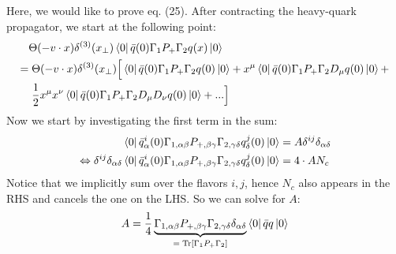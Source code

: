 \documentclass[openright,twoside,12pt,a4paper,final]{article}
\begin{document}
	\noindent
	Here, we would like to prove eq. (25).
	After contracting the heavy-quark propagator, we start at the following point:
	\begin{align}
		&\Theta(-v \cdot x) \delta^{(3)}(x_{\perp}) \bra{0}\bar{q}(0) \Gamma_1 P_+ \Gamma_2 q(x)\ket{0} \nonumber \\ =& \; \Theta(-v \cdot x) \delta^{(3)}(x_{\perp}) \Big[ \bra{0}\bar{q}(0) \Gamma_1 P_+ \Gamma_2 q(0)\ket{0} + x^{\mu} \bra{0}\bar{q}(0) \Gamma_1 P_+ \Gamma_2 D_{\mu} q(0)\ket{0} + \nonumber \\& \; \frac{1}{2} x^{\mu} x^{\nu} \bra{0}\bar{q}(0) \Gamma_1 P_+ \Gamma_2 D_{\mu} D_{\nu} q(0)\ket{0} + ...\Big]
	\end{align}
	Now we start by investigating the first term in the sum:
	\begin{align}
		\bra{0}\bar{q}_{\alpha}^i(0) \Gamma_{1,\alpha \beta} P_{+,\beta \gamma} \Gamma_{2,\gamma \delta} q_{\delta}^j(0)\ket{0} =& \; A \delta^{ij} \delta_{\alpha \delta} \\ \Leftrightarrow \delta^{ij} \delta_{\alpha \delta} \bra{0}\bar{q}_{\alpha}^i(0) \Gamma_{1,\alpha \beta} P_{+,\beta \gamma} \Gamma_{2,\gamma \delta} q_{\delta}^j(0)\ket{0} =& \; 4 \cdot A N_c 
	\end{align}
	Notice that we implicitly sum over the flavors $i,j$, hence $N_c$ also appears in the RHS and cancels the one on the LHS. So we can solve for $A$:
	\begin{align}
		A = \frac{1}{4} \underbrace{\Gamma_{1,\alpha \beta} P_{+,\beta \gamma} \Gamma_{2,\gamma \delta} \delta_{\alpha \delta}}_{ = \; \mathrm{Tr}[\Gamma_1 P_+ \Gamma_2]} \bra{0}\bar{q}q\ket{0}
	\end{align}
\end{document}

